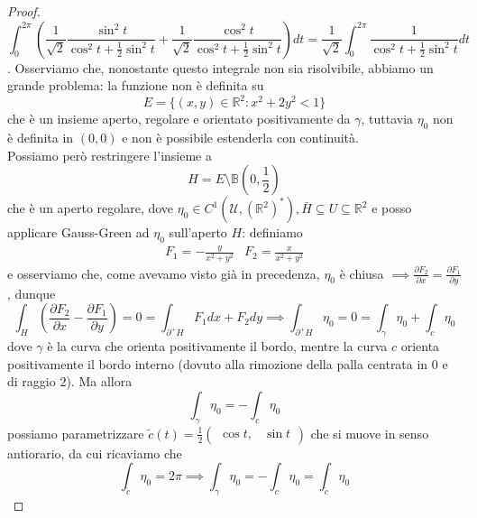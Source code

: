 \begin{proof}
	$$\int_{0}^{2\pi} \left(\frac{1}{\sqrt{2}} \frac{\sin^2{t}}{\cos^2{t} + \frac{1}{2} \sin^2{t}} + \frac{1}{\sqrt{2}} \frac{\cos^2{t}}{\cos^2{t} + \frac{1}{2} \sin^2{t}} \right)dt = \frac{1}{\sqrt{2}} \int_0^{2\pi} \frac{1}{\cos^2{t} + \frac{1}{2} \sin^2{t}}dt$$. Osserviamo che, nonostante questo integrale non sia risolvibile, abbiamo un grande problema: la funzione non è definita su
	$$
	E = \{(x, y) \in \mathbb{R}^2 : x^2 + 2y^2 < 1 \}
	$$
	che è un insieme aperto, regolare e orientato positivamente da $\gamma$, tuttavia $\eta_0$ non è definita in $(0, 0)$ e non è possibile estenderla con continuità. \\
	Possiamo però restringere l'insieme a
	$$
	H = E \setminus \mathbb{B}(0, \frac{1}{2})
	$$
	che è un aperto regolare, dove $\eta_0 \in C^1(\mathcal{U}, (\mathbb{R}^2)^*), \bar{H} \subseteq U \subseteq \mathbb{R}^2$ e posso applicare Gauss-Green ad $\eta_0$ sull'aperto $H$: definiamo
	\begin{align*}
		&F_1=-\frac{y}{x^2 + y^2}	&	F_2 = \frac{x}{x^2 + y^2} &
	\end{align*}
	e osserviamo che, come avevamo visto già in precedenza, $\eta_0$ è chiusa $\implies \frac{\partial F_2}{\partial x} = \frac{\partial F_1}{\partial y}$, dunque
	$$
	\int_H \left(\frac{\partial F_2}{\partial x} - \frac{\partial F_1}{\partial y} \right) = 0 = \int_{\partial^{+} H} F_1 dx + F_2 dy \implies  \int_{\partial^{+} H} \eta_0 = 0 = \int_\gamma \eta_0 + \int_c \eta_0
	$$
	dove $\gamma$ è la curva che orienta positivamente il bordo, mentre la curva $c$ orienta positivamente il bordo interno (dovuto alla rimozione della palla centrata in $0$ e di raggio $2$). Ma allora
	$$
	\int_\gamma \eta_0 = - \int_c \eta_0
	$$
	possiamo parametrizzare $\tilde{c}(t) = \frac{1}{2} \begin{pmatrix} \cos{t}, & \sin{t} \end{pmatrix}$ che si muove in senso antiorario, da cui ricaviamo che
	$$
	\int_{\tilde{c}} \eta_0 = 2\pi \implies \int_\gamma \eta_0 = - \int_c \eta_0 = \int_{\tilde{c}} \eta_0
	$$
\end{proof}
